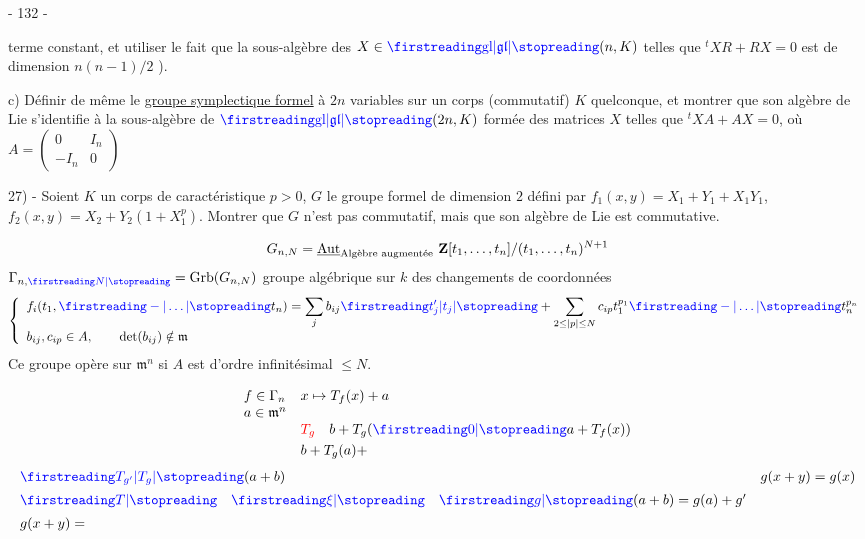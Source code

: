 \begin{center}- 132 -\end{center}

terme constant, et utiliser le fait que la sous-algèbre des $X\in\unsure{\mathrm{gl}|\mathfrak{gl}}(n,K)$ telles que ${}^tXR+RX=0$ est de dimension $n(n-1)/2$ ).

c) Définir de même le \uline{groupe symplectique formel} à $2n$ variables sur un corps (commutatif) $K$ quelconque, et montrer que son algèbre de Lie s'identifie à la sous-algèbre de $\unsure{\mathrm{gl}|\mathfrak{gl}}(2n,K)$ formée des matrices $X$ telles que ${}^tXA+AX=0$, où $A=\begin{pmatrix}0&I_n\\-I_n&0\end{pmatrix}$

27) - Soient $K$ un corps de caractéristique $p>0$, $G$ le groupe formel de dimension $2$ défini par $f_1(x,y)=X_1+Y_1+X_1Y_1$, $f_2(x,y)=X_2+Y_2(1+X_1^p)$. Montrer que $G$ n'est pas commutatif, mais que son algèbre de Lie est commutative.

\[
G_{n,N}=\uline{\mathrm{Aut}}_{\text{Algèbre augmentée}}\ \mathbf Z[t_1,\ldots,t_n]/(t_1,\ldots,t_n)^{N+1}
\]
$\Gamma_{n,\deleted{\unsure{N}}}=\mathrm{Grb}(G_{n,N})$ groupe algébrique sur $k$ des changements de coordonnées
\[
\left\{\begin{array}{l}
f_i(t_1,\unsure{-|\ldots}t_n)=\displaystyle\sum_jb_{ij}\unsure{t'_j|t_j}+\displaystyle\sum_{2\leq|p|\leq N}c_{ip}t_1^{p_1}\unsure{-|\ldots}t_n^{p_n}\\
b_{ij},c_{ip}\in A,\qquad\det(b_{ij})\notin\mathfrak m
\end{array}\right.
\]
Ce groupe opère sur $\mathfrak m^n$ si $A$ est d'ordre infinitésimal $\leq N$. 

\[
\begin{array}{ll}
f\in\Gamma_n & x\mapsto T_f(x)+a\\
a\in\mathfrak m^n & \\
&\deleted{T_g}\quad b+T_g(\deleted{\unsure{0}}a+T_f(x))\\[3pt]
&b+T_g(a)+
\end{array}
\]
\[
\begin{array}{ll}
\unsure{T_{g'}|T_g}(a+b)&g(x+y)=g(x)\\[5pt]
\deleted{\unsure{T}}\quad\deleted{\unsure{\xi}}\quad\unsure{g}(a+b)=g(a)+g'&\\[5pt]
g(x+y)=&
\end{array}
\]

